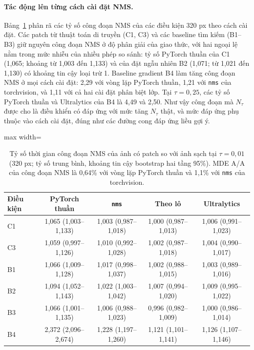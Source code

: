 \documentclass[a4paper,fleqn]{cas-dc}
\newcommand{\Ntau}{N_{\tau}}
\begin{document}
\paragraph{Tác động lên từng cách cài đặt NMS.}
Bảng~\ref{tab:impl} phân rã các tỷ số công đoạn NMS của các điều kiện 320 px theo cách cài đặt. Các patch từ thuật toán di truyền (C1, C3) và các baseline tìm kiếm (B1--B3) giữ nguyên công đoạn NMS ở độ phân giải của giao thức, với hai ngoại lệ nằm trong mức nhiễu của nhiều phép so sánh: tỷ số PyTorch thuần của C1 (1,065; khoảng từ 1,003 đến 1,133) và của đặt ngẫu nhiên B2 (1,071; từ 1,021 đến 1,130) có khoảng tin cậy loại trừ 1. Baseline gradient B4 làm tăng công đoạn NMS ở mọi cách cài đặt: 2,29 với vòng lặp PyTorch thuần, 1,21 với \texttt{nms} của torchvision, và 1,11 với cả hai cài đặt phân biệt lớp. Tại $\tau=0{,}25$, các tỷ số PyTorch thuần và Ultralytics của B4 là 4,49 và 2,50. Như vậy công đoạn mà $\Ntau$ được cho là điều khiển có đáp ứng với mức tăng $\Ntau$ thật, và mức đáp ứng phụ thuộc vào cách cài đặt, đúng như các đường cong đáp ứng liều gợi ý.

\begin{table}[!tp]
\centering\small
\caption{Tỷ số thời gian công đoạn NMS của ảnh có patch so với ảnh sạch tại $\tau=0{,}01$ (320 px; tỷ số trung bình, khoảng tin cậy bootstrap hai tầng 95\%). MDE A/A của công đoạn NMS là 0,64\% với vòng lặp PyTorch thuần và 1,1\% với \texttt{nms} của torchvision.}
\label{tab:impl}
\begin{adjustbox}{max width=\textwidth}
\begin{tabular}{@{}lcccc@{}}
\toprule
Điều kiện & PyTorch thuần & \texttt{nms} & Theo lô & Ultralytics \\
\midrule
C1 & 1,065 (1,003--1,133) & 1,003 (0,987--1,018) & 1,000 (0,987--1,013) & 1,006 (0,991--1,023) \\
C3 & 1,059 (0,997--1,126) & 1,010 (0,992--1,028) & 1,002 (0,987--1,018) & 1,004 (0,990--1,017) \\
B1 & 1,066 (1,009--1,128) & 1,017 (0,998--1,037) & 1,002 (0,988--1,015) & 1,003 (0,989--1,016) \\
B2 & 1,094 (1,052--1,143) & 1,022 (1,003--1,042) & 1,007 (0,994--1,020) & 1,009 (0,995--1,022) \\
B3 & 1,066 (1,001--1,135) & 1,006 (0,988--1,023) & 0,996 (0,982--1,009) & 1,000 (0,986--1,014) \\
B4 & 2,372 (2,096--2,674) & 1,228 (1,197--1,260) & 1,121 (1,101--1,141) & 1,126 (1,107--1,146) \\
\bottomrule
\end{tabular}
\end{adjustbox}
\end{table}
\end{document}

